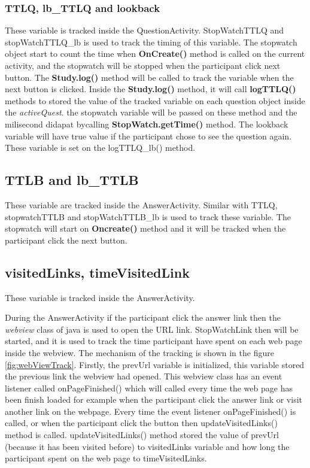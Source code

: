 \subsubsection{TTLQ, lb\_TTLQ and lookback}
These variable is tracked inside the QuestionActivity.
StopWatchTTLQ and stopWatchTTLQ\_lb is used to track the timing of this variable.
The stopwatch object start to count the time when \textbf{OnCreate()} method is called on the current activity,
and the stopwatch will be stopped when the participant click next button. The \textbf{Study.log()} method will be called to track the variable when the next button is clicked.
 Inside the \textbf{Study.log()} method, it will call \textbf{logTTLQ()} methods to stored the value of the tracked variable on each question object inside the \textit{activeQuest}.
the stopwatch variable will be passed on these method and the milisecond didapat bycalling \textbf{StopWatch.getTime()} method.
The lookback variable will have true value if the participant chose to see the question again. These variable is set on the logTTLQ\_lb() method.

\subsection{TTLB and lb\_TTLB}
These variable are tracked inside the AnswerActivity. Similar with TTLQ,
stopwatchTTLB and stopWatchTTLB\_lb is used to track these variable.
The stopwatch will start on \textbf{Oncreate()} method and it will be tracked when the participant click the next button.

\subsection{visitedLinks, timeVisitedLink}
These variable is tracked inside the AnswerActivity.

During the AnswerActivity if the participant click the answer link then the \textit{webview} class of
java is used to open the URL link. StopWatchLink then will be started, and it is used to track the time participant have spent on each web page inside the webview.
The mechanism of the tracking is shown in the figure \ref{fig:webViewTrack}. Firstly, the prevUrl variable is initialized,
this variable stored the previous link the webview had opened. This webview class has an event listener called onPageFinished() which will called every time the web page
 has been finish loaded for example when the participant click the answer link or visit another link on the webpage. Every time the event listener onPageFinished() is called,
 or when the participant click the button then updateVisitedLinks() method is called. updateVisitedLinks() method stored the value of prevUrl (because it has been visited before)
 to visitedLinks variable and how long the participant spent on the web page to timeVisitedLinks.

